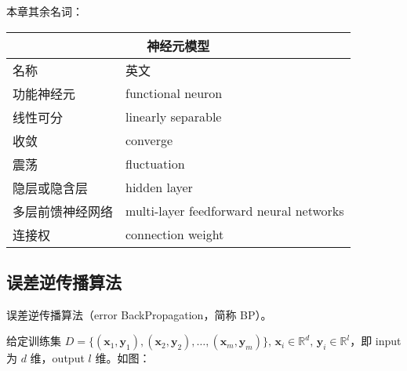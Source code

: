 \documentclass[../studies-ml.tex]{subfiles}
\begin{document}
本章其余名词：

\begin{center}
  \begin{tabular}{ |p{4cm}||p{7cm}|  }
    \hline
    \multicolumn{2}{|c|}{\textbf{神经元模型}}               \\
    \hline
    名称       & 英文                                      \\
    \hline
    功能神经元    & functional neuron                       \\
    \hline
    线性可分     & linearly separable                      \\
    \hline
    收敛       & converge                                \\
    \hline
    震荡       & fluctuation                             \\
    \hline
    隐层或隐含层   & hidden layer                            \\
    \hline
    多层前馈神经网络 & multi-layer feedforward neural networks \\
    \hline
    连接权      & connection weight                       \\
    \hline
  \end{tabular}
\end{center}

\newpage

\subsection{误差逆传播算法}

误差逆传播算法（error BackPropagation，简称 BP）。

给定训练集 $D = \{(\pmb{x}_1, \pmb{y}_1), (\pmb{x}_2, \pmb{y}_2),\dots,(\pmb{x}_m, \pmb{y}_m)\},\,
  \pmb{x}_i \in \mathbb{R}^d,\, \pmb{y}_i \in \mathbb{R}^l$，即 input 为 $d$ 维，output $l$ 维。如图：
\end{document}
